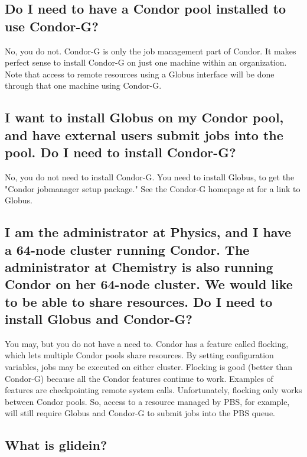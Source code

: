 
\subsection*{Do I need to have a Condor pool installed to use Condor-G?}
No, you do not.
Condor-G is only the job management part of Condor.
It makes perfect sense to install Condor-G on just one machine
within an organization.
Note that access to remote resources using a Globus interface
will be done through that one machine using Condor-G.

\subsection*{I want to install Globus on my Condor pool, and have external users submit jobs into the pool. Do I need to install Condor-G?}

No, you do not need to install Condor-G.
You need to install Globus,
to get the "Condor jobmanager setup package."
See the Condor-G
homepage at 
for a link to Globus.

\subsection*{I am the administrator at Physics, and I have a 64-node cluster
running Condor.
The administrator at Chemistry is also running Condor on her 64-node cluster.
We would like to be able to share resources.
Do I need to install Globus and Condor-G?}

You may, but you do not have a need to.
Condor has a feature called flocking,
which lets multiple Condor pools share resources.
By setting configuration variables, jobs may be executed on
either cluster.
Flocking is good (better than Condor-G) because
all the Condor features continue to work.
Examples of features are
checkpointing remote system calls.
Unfortunately, flocking only works between Condor pools.
So, access to a resource managed by PBS, for example,
will still require Globus and Condor-G to submit jobs into the PBS queue.

\subsection*{What is glidein?}

